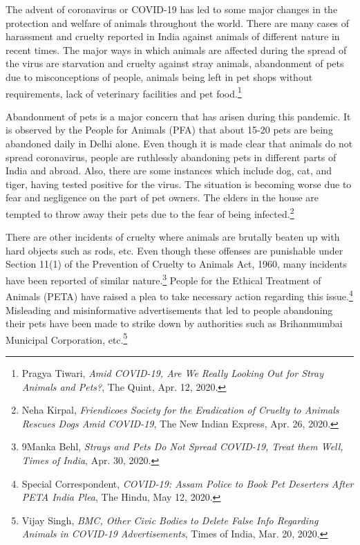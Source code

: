 \begin{multicols}{2}

\noi
The advent of coronavirus or COVID-19 has led to some major changes in the protection and
welfare of animals throughout the world. There are many cases of harassment and cruelty
reported in India against animals of different nature in recent times. The major ways in which
animals are affected during the spread of the virus are starvation and cruelty against stray
animals, abandonment of pets due to misconceptions of people, animals being left in pet
shops without requirements, lack of veterinary facilities and pet food.\footnote{Pragya Tiwari, \textit{Amid COVID-19, Are We Really Looking Out for Stray Animals and Pets?}, The Quint, Apr. 12, 2020.}

\noi
Abandonment of pets is a major concern that has arisen during this pandemic. It is observed
by the People for Animals (PFA) that about 15-20 pets are being abandoned daily in Delhi
alone. Even though it is made clear that animals do not spread coronavirus, people are
ruthlessly abandoning pets in different parts of India and abroad. Also, there are some
instances which include dog, cat, and tiger, having tested positive for the virus. The situation
is becoming worse due to fear and negligence on the part of pet owners. The elders in the
house are tempted to throw away their pets due to the fear of being infected.\footnote{Neha Kirpal, \textit{Friendicoes Society for the Eradication of Cruelty to Animals Rescues Dogs Amid COVID-19}, The New Indian Express, Apr. 26, 2020. }

\noi
There are other incidents of cruelty where animals are brutally beaten up with hard objects
such as rods, etc. Even though these offenses are punishable under Section 11(1) of the
Prevention of Cruelty to Animals Act, 1960, many incidents have been reported of similar
nature.\footnote{9Manka Behl, \textit{Strays and Pets Do Not Spread COVID-19, Treat them Well, Times of India}, Apr. 30, 2020.} People for the Ethical Treatment of Animals (PETA) have raised a plea to take necessary action regarding this issue.\footnote{Special Correspondent, \textit{COVID-19: Assam Police to Book Pet Deserters After PETA India Plea}, The Hindu, May 12, 2020.} Misleading and misinformative advertisements that
led to people abandoning their pets have been made to strike down by authorities such as
Brihanmumbai Municipal Corporation, etc.\footnote{Vijay Singh, \textit{BMC, Other Civic Bodies to Delete False Info Regarding Animals in COVID-19 Advertisements}, Times of India, Mar. 20, 2020.}


\end{multicols}
